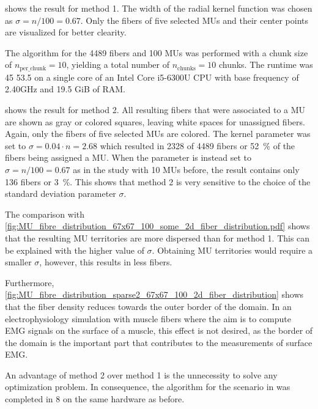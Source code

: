  shows the result for method 1. The width of the radial kernel function was chosen as $\sigma = n/100 = \num{0.67}$. Only the fibers of five selected MUs and their center points are visualized for better clearity.

The algorithm for the 4489 fibers and 100 MUs was performed with a  chunk size of $n_\text{per\_chunk}=10$, yielding a total number of $n_\text{chunks}=10$ chunks. The runtime was \SI{45}{\min} \SI{53.5}{\sec} on a single core of an Intel Core i5-6300U CPU with base frequency of 2.40GHz and 19.5 GiB of RAM.

 shows the result for method 2. All resulting fibers that were associated to a MU are shown as gray or colored squares, leaving white spaces for unassigned fibers. Again, only the fibers of five selected MUs are colored. The kernel parameter was set to $\sigma = 0.04\cdot n = \num{2.68}$ which resulted in 2328 of 4489 fibers or \SI{52}{\percent} of the fibers being assigned a MU. When the parameter is instead set to $\sigma = n/100  = \num{0.67}$ as in the study with 10 MUs before, the result contains only 136 fibers or \SI{3}{\percent}. This shows that method 2 is very sensitive to the choice of the standard deviation parameter $\sigma$.

The comparison with \cref{fig:MU_fibre_distribution_67x67_100_some_2d_fiber_distribution.pdf} shows that the resulting MU territories are more dispersed than for method 1. This can be explained with the higher value of $\sigma$. Obtaining  MU territories would require a smaller $\sigma$, however, this results in less fibers.

Furthermore, \cref{fig:MU_fibre_distribution_sparse2_67x67_100_2d_fiber_distribution} shows that the fiber density reduces towards the outer border of the domain. In an electrophysiology simulation with muscle fibers where the aim is to compute EMG signals on the surface of a muscle, this effect is not desired, as the border of the domain is the important part that contributes to the measurements of surface EMG.

An advantage of method 2 over method 1 is the unnecessity to solve any optimization problem. In consequence, the algorithm for the scenario in  was completed in \SI{8}{\sec} on the same hardware as before.

